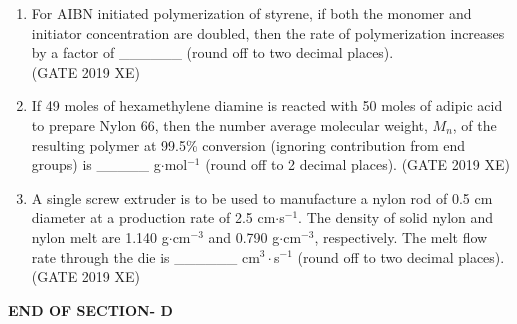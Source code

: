 \documentclass[journal,12pt,onecolumn]{IEEEtran}
\begin{document}
\begin{enumerate}
\item For AIBN initiated polymerization of styrene, if both the monomer and initiator concentration are doubled, then the rate of polymerization increases by a factor of \_\_\_\_\_\_ (round off to two decimal places).\\
\hfill{(GATE 2019 XE)} \\


\item If 49 moles of hexamethylene diamine is reacted with 50 moles of adipic acid to prepare Nylon 66, then the number average molecular weight, $M_{n}$, of the resulting polymer at 99.5\% conversion (ignoring contribution from end groups) is \_\_\_\_\_ g$\cdot$mol$^{-1}$ (round off to 2 decimal places).
\hfill{(GATE 2019 XE)} \\

\newpage

\item A single screw extruder is to be used to manufacture a nylon rod of 0.5 cm diameter at a production rate of 2.5 cm$\cdot$s$^{-1}$. The density of solid nylon and nylon melt are 1.140 g$\cdot$cm$^{-3}$ and 0.790 g$\cdot$cm$^{-3}$, respectively. The melt flow rate through the die is \_\_\_\_\_\_ cm$^{3}\cdot$s$^{-1}$ (round off to two decimal places).\\
\hfill{(GATE 2019 XE)} \\



\end{enumerate}

\vspace{3\baselineskip}
\begin{center}
    \item[\textbf{END OF SECTION- D}]
\end{center}


\newpage
\end{document}
